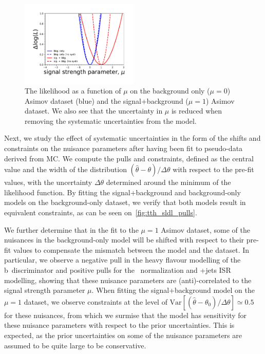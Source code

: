 \begin{figure}
\begin{centering}
\includegraphics[width = 0.5\textwidth]{figures/tth/r_scan.pdf}
\caption[The likelihood as a function of $\mu$]{The likelihood as a function of $\mu$ on the background only ($\mu=0$) Asimov dataset (blue) and the signal+background ($\mu=1$) Asimov dataset. We also see that the uncertainty in $\mu$ is reduced when removing the systematic uncertainties from the model.}
\label{fig:tth_likelihood}
\end{centering}
\end{figure}

Next, we study the effect of systematic uncertainties in the form of the shifts and constraints on the nuisance parameters after having been fit to pseudo-data derived from MC. We compute the pulls and constraints, defined as the central value and the width of the distribution $(\hat{\theta} - \theta) / \Delta\theta$ with respect to the pre-fit values, with the uncertainty $\Delta\theta$ determined around the minimum of the likelihood function. By fitting the signal+background and background-only models on the background-only dataset, we verify that both models result in equivalent constraints, as can be seen on~\cref{fig:tth_sldl_pulls}.

We further determine that in the fit to the $\mu=1$ Asimov dataset, some of the nuisances in the background-only model will be shifted with respect to their pre-fit values to compensate the mismatch between the model and the dataset. In particular, we observe a negative pull in the heavy flavour modelling of the b~discriminator and positive pulls for the \ttbb~normalization and \ttbar+jets ISR modelling, showing that these nuisance parameters are (anti)-correlated to the signal strength parameter $\mu$. When fitting the signal+background model on the $\mu=1$ dataset, we observe constraints at the level of $\mathrm{Var}[(\hat{\theta} - \theta_0)/\Delta \theta] \simeq 0.5$ for these nuisances, from which we surmise that the model has sensitivity for these nuisance parameters with respect to the prior uncertainties. This is expected, as the prior uncertainties on some of the nuisance parameters are assumed to be quite large to be conservative.

